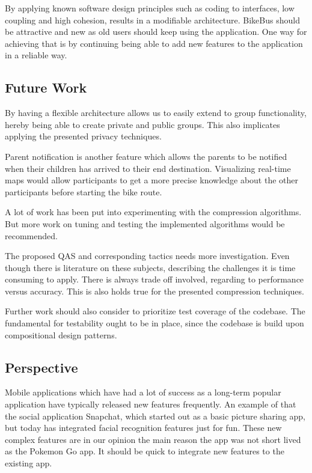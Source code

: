 By applying known software design principles such as coding to interfaces, low coupling and high cohesion, results in a modifiable architecture. BikeBus should be attractive and new as old users should keep using the application. One way for achieving that is by continuing being able to add new features to the application in a reliable way.   

\subsection{Future Work}
By having a flexible architecture allows us to easily extend to group functionality, hereby being able to create private and public groups. This also implicates applying the presented privacy techniques. 

Parent notification is another feature which allows the parents to be notified when their children has arrived to their end destination. Visualizing real-time maps would allow participants to get a more precise knowledge about the other participants before starting the bike route.     

A lot of work has been put into experimenting with the compression algorithms. But more work on tuning and testing the implemented algorithms would be recommended.

The proposed QAS and corresponding tactics needs more investigation. Even though there is literature on these subjects, describing the challenges it is time consuming to apply. There is always trade off involved, regarding to performance versus accuracy.  This is also holds true for the presented compression techniques.

Further work should also consider to prioritize test coverage of the codebase. The fundamental for testability ought to be in place, since the codebase is build upon compositional design patterns.  


\subsection{Perspective}
Mobile applications which have had a lot of success as a long-term popular application have typically released new features frequently. An example of that the social application Snapchat, which started out as a basic picture sharing app, but today has integrated facial recognition features just for fun. These new complex features are in our opinion the main reason the app was not short lived as the Pokemon Go app. It should be quick to integrate new features to the existing app.

